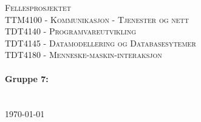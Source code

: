 \begin{titlepage}
\begin{center} 

\vspace*{3cm}
\textsc{\Huge Fellesprosjektet}\\[0.7cm]
\textsc{TTM4100 - Kommunikasjon - Tjenester og nett}\\[0.2cm]
\textsc{TDT4140 - Programvareutvikling}\\[0.2cm]
\textsc{TDT4145 - Datamodellering og Databasesytemer}\\[0.2cm]
\textsc{TDT4180 - Menneske-maskin-interaksjon}\\[0.2cm]
\\[1.6cm]

\textbf{\Large Gruppe 7:} \\[0.2cm]
 \\
\\[1cm] 

\today

\end{center}
\end{titlepage}
